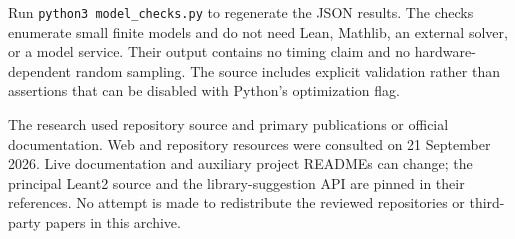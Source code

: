 \documentclass[11pt,a4paper]{article}
\newcommand{\code}[1]{\nolinkurl{#1}}
\theoremstyle{remark}
\begin{document}
Run \code{python3 model_checks.py} to regenerate the JSON results. The checks enumerate small finite models and do not need Lean, Mathlib, an external solver, or a model service. Their output contains no timing claim and no hardware-dependent random sampling. The source includes explicit validation rather than assertions that can be disabled with Python's optimization flag.

The research used repository source and primary publications or official documentation. Web and repository resources were consulted on 21 September 2026. Live documentation and auxiliary project READMEs can change; the principal Leant2 source and the library-suggestion API are pinned in their references. No attempt is made to redistribute the reviewed repositories or third-party papers in this archive.

\newpage
\end{document}
